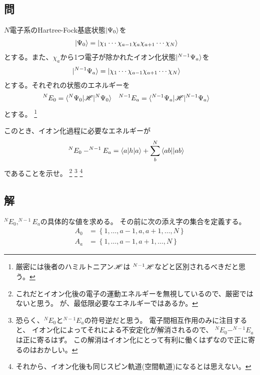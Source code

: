 \subsection{問}
$N$電子系のHartree-Fock基底状態$\ket{\Psi_0}$を
\begin{align}
	\ket{\Psi_0}
&=
	\ket{\chi_1 \cdots \chi_{a-1} \chi_a \chi_{a+1} \cdots \chi_N}
\end{align}
とする。また、$\chi_a$から1つ電子が除かれたイオン化状態$\ket{^{N-1}\Psi_a}$を
\begin{align}
	\ket{^{N-1}\Psi_a}
&=
	\ket{\chi_1 \cdots \chi_{a-1} \chi_{a+1} \cdots \chi_N}
\end{align}
とする。それぞれの状態のエネルギーを
\begin{align}
	^{N}E_0
&=
	\braket{^{N}\Psi_0|\H|^{N}\Psi_0} &
%
%
	^{N-1}E_a
&=
	\braket{^{N-1}\Psi_a|\H|^{N-1}\Psi_a}
\end{align}
とする。
	\footnote{
		厳密には後者のハミルトニアン${\mathscr{H}}$は
		$^{N-1}{\mathscr{H}}$などと区別されるべきだと思う。
	}

このとき、イオン化過程に必要なエネルギーが
\begin{align}
	^{N}E_0
	-
	^{N-1}E_a
&=
	\braket{a|h|a}
	+
	\sum_b^N {\braket{ab||ab}}
\end{align}
であることを示せ。
	\footnote{
		これだとイオン化後の電子の運動エネルギーを無視しているので、厳密ではないと思う。
		が、最低限必要なエネルギーではあるか。
	}
	\footnote{
		恐らく、$^{N}E_0$と$^{N-1}E_a$の符号逆だと思う。
		電子間相互作用のみに注目すると、
		イオン化によってそれによる不安定化が解消されるので、
		$^{N}E_0-^{N-1}E_a$は正に寄るはず。
		この解消はイオン化にとって有利に働くはずなので正に寄るのはおかしい。
	}
	\footnote{
		それから、イオン化後も同じスピン軌道(空間軌道)になるとは思えない。
	}


\subsection{解}
$^{N}E_0,^{N-1}E_a$の具体的な値を求める。
その前に次の添え字の集合を定義する。
\begin{align}
	A_0
&=
	\left\{
		1,\dots,a-1,a,a+1,\dots,N
	\right\} \\
%
%
	A_a
&=
	\left\{
		1,\dots,a-1,a+1,\dots,N
	\right\}
\end{align}

